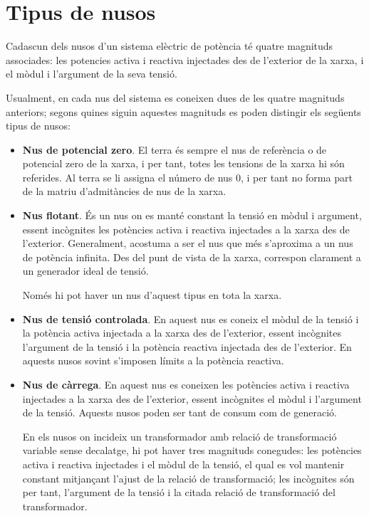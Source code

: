 \section{Tipus de nusos} 

Cadascun dels nusos d'un sistema elèctric de potència té quatre
magnituds associades: les potencies activa i reactiva injectades des
de l'exterior de la xarxa, i el mòdul i l'argument de la seva
tensió.

Usualment, en cada nus del sistema es coneixen dues de les quatre
magnituds anteriors; segons quines siguin aquestes magnituds es
poden distingir els següents tipus de nusos:
\begin{itemize}
    \item \textbf{Nus de potencial zero}. El terra és sempre el nus de referència o de potencial zero de la
    xarxa, i per tant, totes les tensions de la xarxa hi són referides.
    Al terra se li assigna el número de nus 0, i per tant no forma part de la matriu d'admitàncies de nus de la xarxa.

   \item \textbf{Nus flotant}. És un nus on es manté constant la tensió en mòdul i argument,
   essent incògnites les potències activa i reactiva injectades a la xarxa des de l'exterior.
    Generalment, acostuma a ser el nus que més s'aproxima a un nus de potència infinita. Des del
    punt de vista de la xarxa, correspon clarament a un generador ideal de tensió.

Només hi pot haver un nus d'aquest tipus en tota la xarxa.
   \item \textbf{Nus de tensió controlada}. En aquest nus es coneix el mòdul de la tensió i la
   potència activa injectada a la xarxa des de l'exterior, essent incògnites l'argument de la tensió i la potència
   reactiva injectada des de l'exterior. En aquests nusos sovint s'imposen límits a la potència reactiva.

   \item \textbf{Nus de càrrega}. En aquest nus es coneixen les potències activa i reactiva
   injectades a la xarxa des de l'exterior, essent incògnites el mòdul i l'argument de la tensió.
   Aquests nusos poden ser tant de consum com de generació.

En els nusos on incideix un transformador amb relació de
transformació variable sense decalatge, hi pot haver tres magnituds
conegudes: les potències activa i reactiva injectades i el mòdul de
la tensió, el qual es vol mantenir constant mitjançant l'ajust de la
relació de transformació; les incògnites són per tant, l'argument de
la tensió i la citada relació de transformació del transformador.
\end{itemize}

